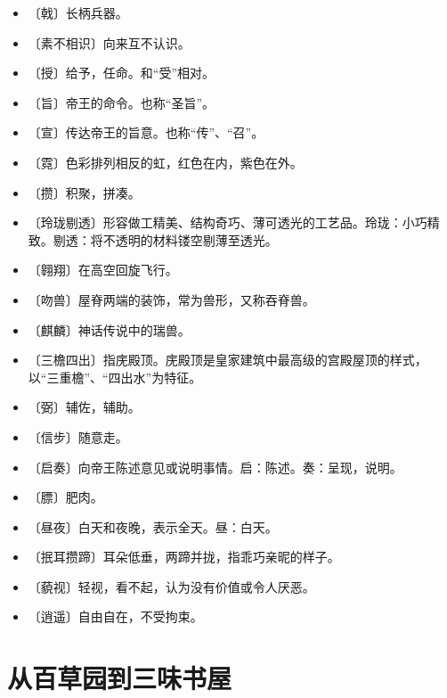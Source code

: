 \documentclass[12pt,UTF-8,openany]{ctexbook}
\begin{document}
\begin{itemize}
    \setlength\itemsep{-0.2em}
    \item 〔戟〕长柄兵器。
    \item 〔素不相识〕向来互不认识。
    \item 〔授〕给予，任命。和“受”相对。
    \item 〔旨〕帝王的命令。也称“圣旨”。
    \item 〔宣〕传达帝王的旨意。也称“传”、“召”。
    \item 〔霓〕色彩排列相反的虹，红色在内，紫色在外。
    \item 〔攒〕积聚，拼凑。
    \item 〔玲珑剔透〕形容做工精美、结构奇巧、薄可透光的工艺品。玲珑：小巧精致。剔透：将不透明的材料镂空剔薄至透光。
    \item 〔翱翔〕在高空回旋飞行。
    \item 〔吻兽〕屋脊两端的装饰，常为兽形，又称吞脊兽。
    \item 〔麒麟〕神话传说中的瑞兽。
    \item 〔三檐四出〕指庑殿顶。庑殿顶是皇家建筑中最高级的宫殿屋顶的样式，以“三重檐”、“四出水”为特征。
    \item 〔弼〕辅佐，辅助。
    \item 〔信步〕随意走。
    \item 〔启奏〕向帝王陈述意见或说明事情。启：陈述。奏：呈现，说明。
    \item 〔膘〕肥肉。
    \item 〔昼夜〕白天和夜晚，表示全天。昼：白天。
    \item 〔抿耳攒蹄〕耳朵低垂，两蹄并拢，指乖巧亲昵的样子。
    \item 〔藐视〕轻视，看不起，认为没有价值或令人厌恶。
    \item 〔逍遥〕自由自在，不受拘束。
\end{itemize}

\chapter{从百草园到三味书屋}
\end{document}
